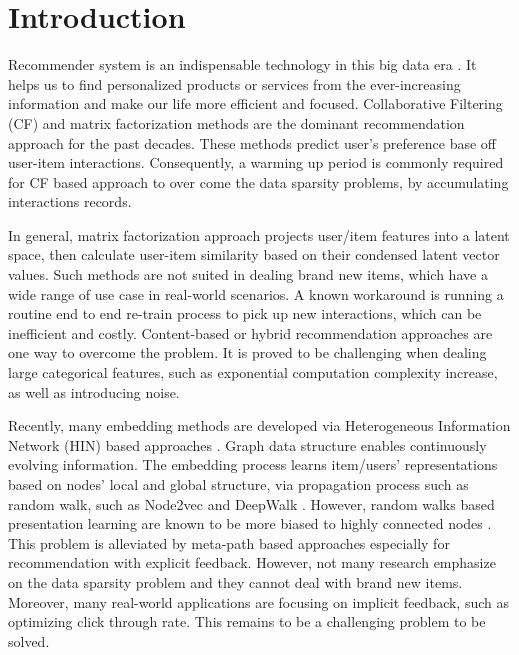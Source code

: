 \section{Introduction}

Recommender system is an indispensable technology in this big data era \cite{lu2015recommender}. It helps us to find personalized products or services from the ever-increasing information and make our life more efficient and focused. Collaborative Filtering (CF) and matrix factorization methods are the dominant recommendation approach for the past decades. These methods predict user's preference base off user-item interactions. Consequently, a warming up period is commonly required for CF based approach to over come the data sparsity problems, by accumulating interactions records.

In general, matrix factorization approach projects user/item features into a latent space, then calculate user-item similarity based on their condensed latent vector values. Such methods are not suited in dealing brand new items, which have a wide range of use case in real-world scenarios. A known workaround is running a routine end to end re-train process to pick up new interactions, which can be inefficient and costly. Content-based or hybrid recommendation approaches are one way to overcome the problem. It is proved to be challenging when dealing large categorical features, such as exponential computation complexity increase, as well as introducing noise.

Recently, many embedding methods are developed via Heterogeneous Information Network (HIN) based approaches \cite{mao2016multirelational,wang2016member}. Graph data structure enables continuously evolving information. The embedding process learns item/users' representations based on nodes' local and global structure, via propagation process such as random walk, such as Node2vec \cite{grover2016node2vec} and DeepWalk \cite{perozzi2014deepwalk}. However, random walks based presentation learning are known to be more biased to highly connected nodes \cite{sun2011pathsim}. This problem is alleviated by meta-path based approaches \cite{dong2017metapath2vec} especially for recommendation with explicit feedback. However, not many research emphasize on the data sparsity problem and they cannot deal with brand new items. Moreover, many real-world applications are focusing on implicit feedback, such as optimizing click through rate. This remains to be a challenging problem to be solved.

